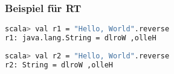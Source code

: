 	\begin{frame}[fragile]
		\frametitle{Beispiel für RT}
		\begin{lstlisting}[language=bash]
scala> val r1 = "Hello, World".reverse
r1: java.lang.String = dlroW ,olleH 
		
scala> val r2 = "Hello, World".reverse 
r2: String = dlroW ,olleH 
		
\end{lstlisting}
\end{frame}